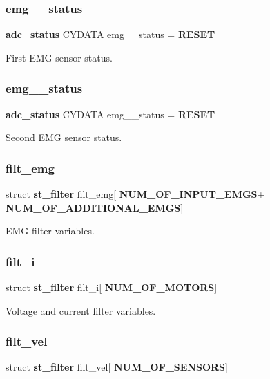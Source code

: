 \subsubsection{emg\+\_\+\_\+status}
{\footnotesize\ttfamily \textbf{ adc\+\_\+status} C\+Y\+D\+A\+TA emg\+\_\+\_\+status = \textbf{ R\+E\+S\+ET}}

First E\+MG sensor status. \mbox{\label{globals_8c_ab157f05be16bbec6bbbf4966ee61f5cd}} 
\subsubsection{emg\+\_\+\_\+status}
{\footnotesize\ttfamily \textbf{ adc\+\_\+status} C\+Y\+D\+A\+TA emg\+\_\+\_\+status = \textbf{ R\+E\+S\+ET}}

Second E\+MG sensor status. \mbox{\label{globals_8c_aad3d2663356b48553e2b22e0a9fd917e}} 
\subsubsection{filt\+\_\+emg}
{\footnotesize\ttfamily struct \textbf{ st\+\_\+filter} filt\+\_\+emg[\textbf{ N\+U\+M\+\_\+\+O\+F\+\_\+\+I\+N\+P\+U\+T\+\_\+\+E\+M\+GS}+\textbf{ N\+U\+M\+\_\+\+O\+F\+\_\+\+A\+D\+D\+I\+T\+I\+O\+N\+A\+L\+\_\+\+E\+M\+GS}]}

E\+MG filter variables. \mbox{\label{globals_8c_ad09553d6780c43066a9ac4385658bcf1}} 
\subsubsection{filt\+\_\+i}
{\footnotesize\ttfamily struct \textbf{ st\+\_\+filter} filt\+\_\+i[\textbf{ N\+U\+M\+\_\+\+O\+F\+\_\+\+M\+O\+T\+O\+RS}]}

Voltage and current filter variables. \mbox{\label{globals_8c_af2dc9b0614aeaf7a377d209416bee61c}} 
\subsubsection{filt\+\_\+vel}
{\footnotesize\ttfamily struct \textbf{ st\+\_\+filter} filt\+\_\+vel[\textbf{ N\+U\+M\+\_\+\+O\+F\+\_\+\+S\+E\+N\+S\+O\+RS}]}

